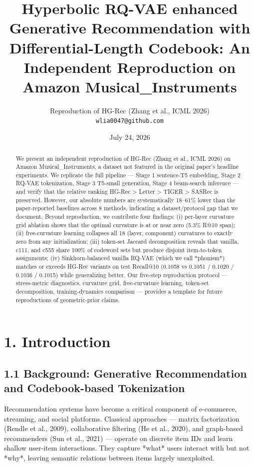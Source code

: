 \documentclass[11pt]{article}
\title{Hyperbolic RQ-VAE enhanced Generative Recommendation with Differential-Length Codebook: An Independent Reproduction on Amazon Musical\_Instruments}
\author{Reproduction of HG-Rec (Zhang et al., ICML 2026) \\ \texttt{wlia0047@github.com}}
\date{July 24, 2026}
\begin{document}
\maketitle

\begin{abstract}
We present an independent reproduction of HG-Rec (Zhang et al., ICML 2026) on Amazon Musical\_Instruments, a dataset not featured in the original paper's headline experiments. We replicate the full pipeline — Stage 1 sentence-T5 embedding, Stage 2 RQ-VAE tokenization, Stage 3 T5-small generation, Stage 4 beam-search inference — and verify that the relative ranking HG-Rec > Letter > TIGER > SASRec is preserved. However, our absolute numbers are systematically 18–61\% lower than the paper-reported baselines across 8 methods, indicating a dataset/protocol gap that we document. Beyond reproduction, we contribute four findings: (i) per-layer curvature grid ablation shows that the optimal curvature is at or near zero (5.3\% R@10 span); (ii) free-curvature learning collapses all 18 (layer, component) curvatures to exactly zero from any initialization; (iii) token-set Jaccard decomposition reveals that vanilla, c111, and c555 share 100\% of codeword sets but produce disjoint item-to-token assignments; (iv) Sinkhorn-balanced vanilla RQ-VAE (which we call *phonism*) matches or exceeds HG-Rec variants on test Recall@10 (0.1058 vs 0.1051 / 0.1020 / 0.1036 / 0.1015) while generalizing better. Our five-step reproduction protocol — stress-metric diagnostics, curvature grid, free-curvature learning, token-set decomposition, training-dynamics comparison — provides a template for future reproductions of geometric-prior claims.
\end{abstract}


\section{1. Introduction}


\subsection{1.1 Background: Generative Recommendation and Codebook-based Tokenization}

Recommendation systems have become a critical component of e-commerce, streaming, and social platforms. Classical approaches — matrix factorization (Rendle et al., 2009), collaborative filtering (He et al., 2020), and graph-based recommenders (Sun et al., 2021) — operate on discrete item IDs and learn shallow user-item interactions. They capture *what* users interact with but not *why*, leaving semantic relations between items largely unexploited.
\end{document}
